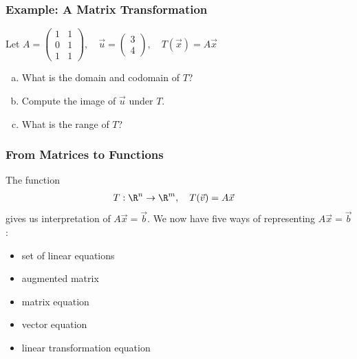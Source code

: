 \begin{frame}
\frametitle{Example: A Matrix Transformation}

Let  $A=\begin{pmatrix} 1&1\\0&1\\1&1 \end{pmatrix}, \quad
\vec u=\begin{pmatrix} 3\\4 \end{pmatrix}, \quad
T(\vec x) = A\vec x $\\[12pt]

\begin{enumerate}[a)]

    \item What is the domain and codomain of $T$? \vfill

    \item Compute the image of $\vec u$ under $T$. \vfill
    
    \item What is the range of $T$? \vfill
    
\end{enumerate} 

\end{frame}

\begin{frame}
\frametitle{From Matrices to Functions}

The function
\begin{align*}
T: \R^n &\to \R^m, \quad T(\vec v) = A \vec x
\end{align*}
gives us  interpretation of  $A\vec x = \vec b$. We now have five ways of representing $A\vec x = \vec b$:
\begin{itemize}
    \item set of linear equations 
    \item augmented matrix
    \item matrix equation
    \item vector equation 
    \item linear transformation equation
\end{itemize}

\end{frame}

